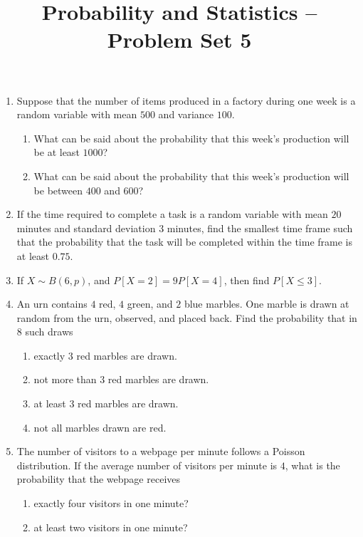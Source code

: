 \documentclass[svgnames]{amsart}
\title[]{Probability and Statistics -- Problem Set 5}
\begin{document}
\maketitle
\begin{enumerate}[leftmargin=*]
\item Suppose that the number of items produced in a factory during one week is a random variable with mean $500$ and variance $100$.
\begin{enumerate}
	\item What can be said about the probability that this week's production will be at least $1000$?
	\item What can be said about the probability that this week's production will be between $400$ and $600$?
\end{enumerate}

\item If the time required to complete a task is a random variable with mean $20$ minutes and standard deviation $3$ minutes, find the smallest time frame such that the probability that the task will be completed within the time frame is at least $0.75$.

\item If $X \sim B(6, p)$, and $P[X = 2] = 9P[X = 4]$, then find $P[X \le 3]$.

\item An urn contains $4$ red, $4$ green, and $2$ blue marbles. One marble is drawn at random from the urn, observed, and placed back. Find the probability that in $8$ such draws
\begin{enumerate}
    \item exactly $3$ red marbles are drawn.
    \item not more than $3$ red marbles are drawn.
    \item at least $3$ red marbles are drawn.
    \item not all marbles drawn are red.
\end{enumerate}

\item The number of visitors to a webpage per minute follows a Poisson distribution. If the average number of visitors per minute is $4$, what is the probability that the webpage receives
\begin{enumerate}[label=(\roman*)]
	\item exactly four visitors in one minute?
	\item at least two visitors in one minute?
\end{enumerate}


\end{enumerate}
\end{document}
